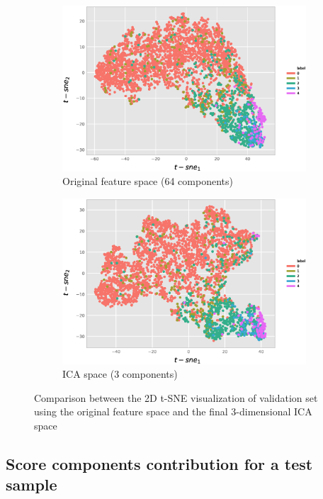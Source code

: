 \documentclass[review]{elsarticle}
\theoremstyle{definition} %
\theoremstyle{remark}
\begin{document}
\begin{figure}[h]
	\centering
	\begin{subfigure}[b]{0.49\textwidth}
		\centering
		\includegraphics[width=\textwidth]{./figures/tsne2d_p75.eps}
		\caption{Original feature space (64 components)}	
	\end{subfigure}
	\begin{subfigure}[b]{0.49\textwidth}
		\centering
		\includegraphics[width=\textwidth]{./figures/tsne2d_ica_p75.eps}
		\caption{ICA space (3 components)}
	\end{subfigure}
	
	\caption{Comparison between the 2D t-SNE visualization of validation set using the original feature space and the final 3-dimensional ICA space}  
	\label{fig:tsne} 
\end{figure}

\subsection{Score components contribution for a test sample}
\end{document}
